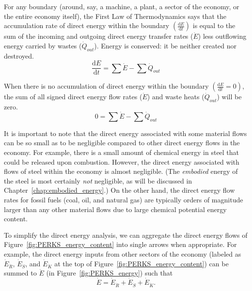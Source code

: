 For any boundary (around, say, a machine, a plant,
a sector of the economy, or the entire economy itself), 
the First Law of Thermodynamics says that 
the accumulation rate 
of direct energy within the 
boundary $\left( \frac{\mathrm{d}E}{\mathrm{d}t} \right)$
is equal to the sum of the incoming and outgoing direct energy transfer 
rates ($\dot{E}$)
less outflowing energy carried by wastes 
($\dot{Q}_{out}$). 
Energy is conserved: it be neither created nor destroyed.
%
\begin{equation} \label{eq:First_Law_with_accumulation}
	\frac{\mathrm{d}E}{\mathrm{d}t} = \sum \dot{E} - \sum \dot{Q}_{out}
\end{equation}

When there is no accumulation of direct energy within the boundary
$\left( \frac{\mathrm{d}E}{\mathrm{d}t} = 0 \right)$, the sum of all 
signed direct energy flow rates ($\dot{E}$) 
and waste heats ($\dot{Q}_{out}$) will be zero.
\begin{equation} \label{eq:First_Law_no_accumulation}
	0 = \sum \dot{E} - \sum \dot{Q}_{out}
\end{equation}

It is important to note that the direct energy associated with some material flows can
be so small as to be negligible compared to other direct energy flows in the economy.
For example, there is a small amount of chemical energy in steel that could be
released upon combustion. 
However, the direct energy associated with flows of steel within the economy
is almost negligible. (The \emph{embodied} energy of the steel is most certainly
\emph{not} negligible, as will be discussed in Chapter~\ref{chap:embodied_energy}.)
On the other hand, the direct energy flow rates for 
fossil fuels
(coal, oil, and natural gas)
are typically orders of magnitude larger than any other 
material flows due to large chemical potential energy content.

To simplify the direct energy analysis, 
we can aggregate the direct energy flows of Figure~\ref{fig:PERKS_energy_content}
into single arrows when appropriate. 
For example, the direct energy inputs from other sectors of the economy
(labeled as $\dot{E}_{\dot{R}}$, $\dot{E}_{\dot{S}}$, and $\dot{E}_{\dot{K}}$ 
at the top of Figure~\ref{fig:PERKS_energy_content}) can be summed to $\dot{E}$ 
(in Figure~\ref{fig:PERKS_energy}) such that
%
\begin{equation} \label{eq:direct_energy_aggregation}
	\dot{E} 
	= \dot{E}_{\dot{R}} 
	+ \dot{E}_{\dot{S}} 
	+ \dot{E}_{\dot{K}}.
\end{equation}

